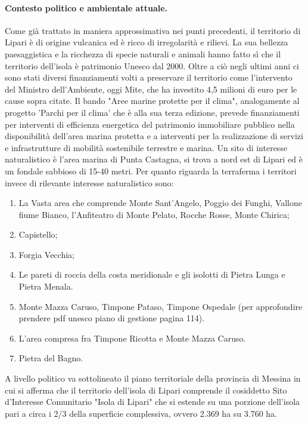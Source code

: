 \documentclass[fleqn,10pt]{SelfArx} %
\begin{document}
\paragraph*{Contesto politico e ambientale attuale.}
Come già trattato in maniera approssimativa nei punti precedenti, il territorio di Lipari è di origine vulcanica ed è ricco di irregolarità e rilievi. 
La sua bellezza paesaggistica e la ricchezza di specie naturali e animali hanno fatto sì che il territorio dell'isola è patrimonio Unesco dal 2000. 
Oltre a ciò negli ultimi anni ci sono stati diversi finanziamenti volti a preservare il territorio come l'intervento del Ministro dell'Ambiente, oggi Mite, che ha investito 4,5 milioni di euro per le cause sopra citate.
Il bando "Aree marine protette per il clima", analogamente al progetto 'Parchi per il clima' che è alla sua terza edizione, prevede finanziamenti per interventi di efficienza energetica del patrimonio immobiliare pubblico nella disponibilità dell'area marina protetta e a interventi per la realizzazione di servizi e infrastrutture di mobilità sostenibile terrestre e marina. 
Un sito di interesse naturalistico è l'area marina di Punta Castagna, si trova a nord est di Lipari ed è un fondale sabbioso di 15-40 metri. 
Per quanto riguarda la terraferma i territori invece di rilevante interesse naturalistico sono:
\begin{enumerate}
	\item La Vasta area che comprende Monte Sant'Angelo, Poggio dei Funghi, Vallone fiume Bianco, l'Anfiteatro di Monte Pelato, Rocche Rosse, Monte Chirica; 
	\item Capistello;
	\item Forgia Vecchia;
	\item Le pareti di roccia della costa meridionale e gli isolotti di Pietra Lunga e Pietra Menala. 
	\item Monte Mazza Caruso, Timpone Pataso, Timpone Ospedale (per approfondire prendere pdf unesco piano di gestione pagina 114).
	\item L'area compresa fra Timpone Ricotta e Monte Mazza Caruso. 
	\item  Pietra del Bagno.
\end{enumerate}
A livello politico va sottolineato il piano territoriale della provincia di Messina in cui si afferma che il territorio dell'isola di Lipari comprende il cosiddetto Sito d'Interesse Comunitario "Isola di Lipari" che si estende su una porzione dell'isola pari a circa i 2/3 della superficie complessiva, ovvero 2.369 ha su 3.760 ha. 
\end{document}
